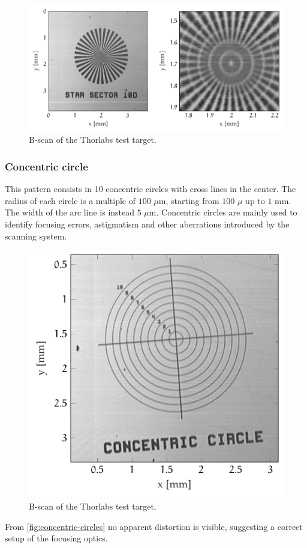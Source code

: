 \begin{figure}[hbt]
	\centering
	\includegraphics[width=1\linewidth]{gfx/ch4/axsun/target/star-sector}
	\caption{B-scan of the Thorlabs test target.}\label{fig:target-star}
\end{figure}

\subsubsection{Concentric circle}
This pattern consists in 10 concentric circles with cross lines in the center. The radius of each circle is a multiple of $100$ $\mu$m, starting from $100$ $\mu$ up to $1$ mm. The width of the arc line is instead $5$ $\mu$m. Concentric circles are mainly used to identify focusing errors, astigmatism and other aberrations introduced by the scanning system. 

\begin{figure}[hbt]
	\centering
	\includegraphics[width=0.5\linewidth]{gfx/ch4/axsun/target/concentric-circles}
	\caption{B-scan of the Thorlabs test target.}\label{fig:concentric-circles}
\end{figure}

From \autoref{fig:concentric-circles} no apparent distortion is visible, suggesting a correct setup of the focusing optics. 



